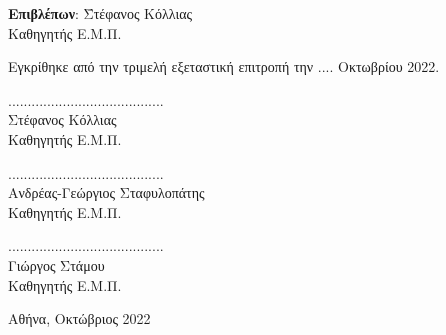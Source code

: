 \begin{titlepage}
\begin{center}
\begin{flushleft}
\begin{tabbing}
            \textbf{Επιβλέπων}: \= Στέφανος Κόλλιας \\
                                \> Καθηγητής Ε.Μ.Π.
        \end{tabbing}
        \end{flushleft}
        \vspace{0.5cm}
        Εγκρίθηκε από την τριμελή εξεταστική επιτροπή την .... Οκτωβρίου 2022.
        \vspace{1cm}

        \large
        \parbox[t]{0.3\textwidth} {
            \center
            ........................................ \\
            Στέφανος Κόλλιας \\
            Καθηγητής Ε.Μ.Π.
        }
        \parbox[t]{0.3\textwidth} {
            \center
            ........................................ \\
            Ανδρέας-Γεώργιος Σταφυλοπάτης  \\
            Καθηγητής Ε.Μ.Π.
        }
        \parbox[t]{0.3\textwidth} {
            \center
            ........................................ \\
            Γιώργος Στάμου  \\
            Καθηγητής Ε.Μ.Π.
        }


            
        \vspace{1.5cm}
            

        \Large

        Αθήνα, Οκτώβριος 2022
            
    \end{center}
\end{titlepage}
